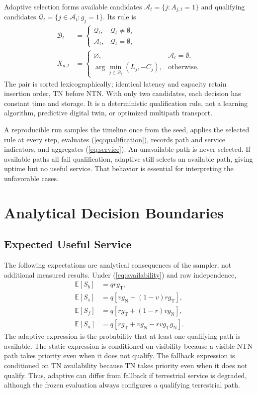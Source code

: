 \documentclass{IEEEoj}
\newcommand{\TN}{\mathrm{T}}
\newcommand{\NTN}{\mathrm{N}}
\begin{document}
Adaptive selection forms available candidates $\mathcal A_t=\{j:A_{j,t}=1\}$ and qualifying candidates $\mathcal Q_t=\{j\in\mathcal A_t:g_j=1\}$. Its rule is
\begin{align}
 \mathcal B_t&=\begin{cases}\mathcal Q_t,&\mathcal Q_t\ne\emptyset,\\\mathcal A_t,&\mathcal Q_t=\emptyset,\end{cases}\\
 X_{a,t}&=\begin{cases}
 \varnothing,&\mathcal A_t=\emptyset,\\
 \arg\min_{j\in\mathcal B_t}(L_j,-C_j),&\text{otherwise}.
 \end{cases}
\end{align}
The pair is sorted lexicographically; identical latency and capacity retain insertion order, TN before NTN. With only two candidates, each decision has constant time and storage. It is a deterministic qualification rule, not a learning algorithm, predictive digital twin, or optimized multipath transport.

A reproducible run samples the timeline once from the seed, applies the selected rule at every step, evaluates (\ref{eq:qualification}), records path and service indicators, and aggregates (\ref{eq:service}). An unavailable path is never selected. If available paths all fail qualification, adaptive still selects an available path, giving uptime but no useful service. That behavior is essential for interpreting the unfavorable cases.

\section{Analytical Decision Boundaries}
\subsection{Expected Useful Service}
The following expectations are analytical consequences of the sampler, not additional measured results. Under (\ref{eq:availability}) and raw independence,
\begin{align}
 \mathbb E[S_b]&=qrg_\TN,\label{eq:baseline}\\
 \mathbb E[S_s]&=q\left[vg_\NTN+(1-v)rg_\TN\right],\\
 \mathbb E[S_f]&=q\left[rg_\TN+(1-r)vg_\NTN\right],\\
 \mathbb E[S_a]&=q\left[rg_\TN+vg_\NTN-rvg_\TN g_\NTN\right].\label{eq:adaptive}
\end{align}
The adaptive expression is the probability that at least one qualifying path is available. The static expression is conditioned on visibility because a visible NTN path takes priority even when it does not qualify. The fallback expression is conditioned on TN availability because TN takes priority even when it does not qualify. Thus, adaptive can differ from fallback if terrestrial service is degraded, although the frozen evaluation always configures a qualifying terrestrial path.
\end{document}
